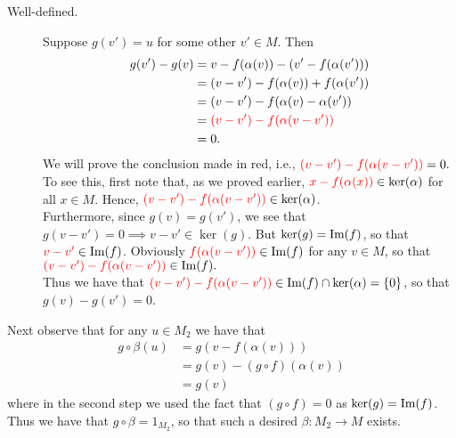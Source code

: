 \begin{prf}
\begin{description}
        \begin{description}
            \item[Well-defined.] 
            Suppose $g(v') = u$ for some other $v' \in M$. Then
            \begin{align*}
                g(v') - g(v) &= v - f(\alpha(v)) - (v' - f(\alpha(v')))\\
                &= (v - v') - f(\alpha(v)) + f(\alpha(v'))\\
                &= (v - v') - f(\alpha(v) - \alpha(v'))\\
                &= \textcolor{red}{(v - v') - f(\alpha(v - v'))}\\
                &= 0.
            \end{align*}
            We will prove the conclusion made in red, i.e., 
            $\textcolor{red}{(v - v') - f(\alpha(v - v'))} = 0.$
            \\

            To see this, first note that, as we proved earlier, $\textcolor{red}{x
            - f(\alpha(x))} \in \ker(\alpha)$
            for all $x \in M$. Hence, $\textcolor{red}{(v - v') - f(\alpha(v - v'))}
            \in \ker(\alpha)$. 
            \\

            Furthermore,
            since $g(v) = g(v')$, we see that $g(v - v')
            = 0 \implies v - v' \in \ker(g)$. But $\ker(g) = \mbox{Im}(f)$,
            so that $\textcolor{red}{v - v'} \in \mbox{Im}(f)$.
            Obviously $\textcolor{red}{f(\alpha(v - v'))} \in
            \mbox{Im}(f)$ for any $v \in M$, so that 
            $\textcolor{red}{(v - v') - f(\alpha(v - v'))}
            \in \mbox{Im}(f).$
            \\

            Thus we have that $\textcolor{red}{(v - v') - f(\alpha(v - v'))} \in \mbox{Im}(f)
            \cap \ker(\alpha) = \{0\}$, so that $g(v) - g(v') =
            0$.  
        \end{description}
        Next observe that for any $u \in M_2$ we have that 
        \begin{align*}
            g \circ \beta (u) &= g(v - f(\alpha(v)))\\
            &= g(v) - (g \circ f)(\alpha(v))\\
            &= g(v)
        \end{align*}
        where in the second step we used the fact that $(g \circ
        f) = 0$ as $\ker(g) = \mbox{Im}(f)$. Thus we have that $g \circ
        \beta = 1_{M_2}$, so that such a desired $\beta: M_2 \to M$
        exists. 


\end{description}
\end{prf}
